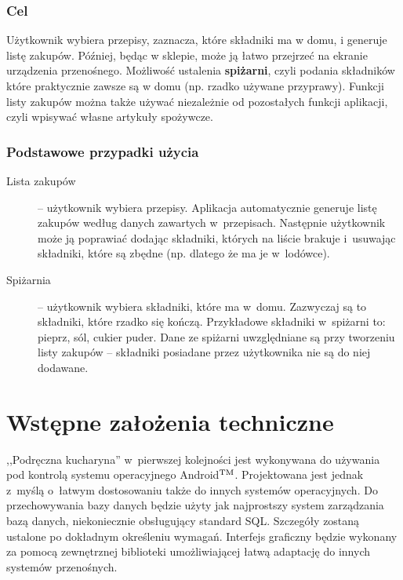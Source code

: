 \documentclass[12pt,leqno, twoside]{mwart}
\def\tm{\leavevmode\hbox{$\rm {}^{TM}$}}
\begin{document}
\subsubsection{Cel}
Użytkownik wybiera przepisy, zaznacza, które składniki ma w domu, i generuje listę zakupów. Później, będąc w sklepie, może ją łatwo przejrzeć na ekranie urządzenia przenośnego. Możliwość ustalenia \textbf{spiżarni}, czyli podania składników które praktycznie zawsze są w domu (np. rzadko używane przyprawy). Funkcji listy zakupów można także używać niezależnie od pozostałych funkcji aplikacji, czyli wpisywać własne artykuły spożywcze.
\subsubsection{Podstawowe przypadki użycia}
\begin{description}
  \item[Lista zakupów] -- użytkownik wybiera przepisy. Aplikacja automatycznie generuje listę zakupów według danych zawartych w~przepisach. Następnie użytkownik może ją poprawiać dodając składniki, których na liście brakuje i~usuwając składniki, które są zbędne (np. dlatego że ma je w~lodówce).
  \item[Spiżarnia] -- użytkownik wybiera składniki, które ma w~domu. Zazwyczaj są to składniki, które rzadko się kończą. Przykładowe składniki w~spiżarni to: pieprz, sól, cukier puder. Dane ze spiżarni uwzględniane są przy tworzeniu listy zakupów -- składniki posiadane przez użytkownika nie są do niej dodawane.
\end{description}
\section{Wstępne założenia techniczne}
,,Podręczna kucharyna'' w~pierwszej kolejności jest wykonywana do używania pod kontrolą systemu operacyjnego Android\tm. Projektowana jest jednak z~myślą o~łatwym dostosowaniu także do innych systemów operacyjnych.
Do przechowywania bazy danych będzie użyty jak najprostszy system zarządzania bazą danych, niekoniecznie obsługujący standard SQL. Szczegóły zostaną ustalone po dokładnym określeniu wymagań. Interfejs graficzny będzie wykonany za pomocą zewnętrznej biblioteki umożliwiającej łatwą adaptację do innych systemów przenośnych.
\end{document}
